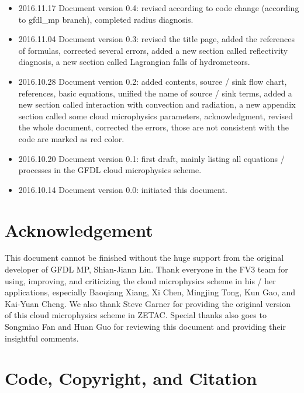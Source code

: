 \documentclass[letterpaper,titlepage,10pt]{article}
\numberwithin{equation}{section}
\begin{document}
\begin{appendices}
\begin{itemize}
	\item 2016.11.17 Document version 0.4: revised according to code change (according to gfdl\_mp branch), completed radius diagnosis.
	\item 2016.11.04 Document version 0.3: revised the title page, added the references of formulas, corrected several errors, added a new section called reflectivity diagnosis, a new section called Lagrangian falls of hydrometeors.
	\item 2016.10.28 Document version 0.2: added contents, source / sink flow chart, references, basic equations, unified the name of source / sink terms, added a new section called interaction with convection and radiation, a new appendix section called some cloud microphysics parameters, acknowledgment, revised the whole document, corrected the errors, those are not consistent with the code are marked as red color.
	\item 2016.10.20 Document version 0.1: first draft, mainly listing all equations / processes in the GFDL cloud microphysics scheme.
	\item 2016.10.14 Document version 0.0: initiated this document.
\end{itemize}

\end{appendices}


\section*{Acknowledgement}

This document cannot be finished without the huge support from the original developer of GFDL MP, Shian-Jiann Lin. Thank everyone in the FV3 team for using, improving, and criticizing the cloud microphysics scheme in his / her applications, especially Baoqiang Xiang, Xi Chen, Mingjing Tong, Kun Gao, and Kai-Yuan Cheng. We also thank Steve Garner for providing the original version of this cloud microphysics scheme in ZETAC. Special thanks also goes to Songmiao Fan and Huan Guo for reviewing this document and providing their insightful comments.


\section*{Code, Copyright, and Citation}
\end{document}
